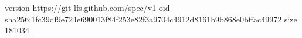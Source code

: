 version https://git-lfs.github.com/spec/v1
oid sha256:1fc39df9e724e690013f84f253e82f3a9704c4912d8161b9b868e0bffac49972
size 181034
